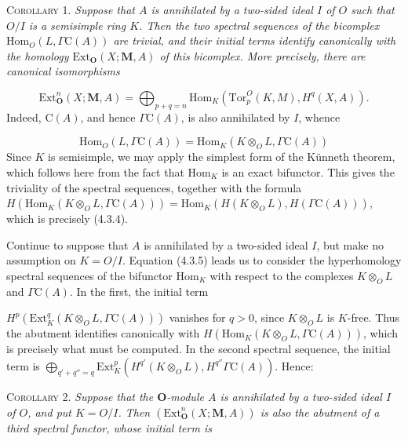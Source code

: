\clearpage
{}

\textsc{Corollary 1.} \textit{Suppose that $A$ is annihilated by a
two-sided ideal $I$ of $O$ such that $O/I$ is a semisimple ring $K$. Then the
two spectral sequences of the bicomplex $\mathrm{Hom}_O(L,\Gamma \mathrm C(A))$ are
trivial, and their initial terms identify canonically with the homology
$\mathrm{Ext}_{\mathbf O}(X;\mathbf M,A)$ of this bicomplex. More precisely,
there are canonical isomorphisms}

\[
\tag{4.3.4}
\mathrm{Ext}_{\mathbf O}^n(X;\mathbf M,A)=
\bigoplus_{p+q=n}
\mathrm{Hom}_K(\mathrm{Tor}_p^O(K,M),H^q(X,A)).
\]
Indeed, $\mathrm C(A)$, and hence $\Gamma \mathrm C(A)$, is also annihilated by $I$, whence

\[
\tag{4.3.5}
\mathrm{Hom}_O(L,\Gamma \mathrm C(A))=
\mathrm{Hom}_K(K\otimes_O L,\Gamma \mathrm C(A))
\]
Since $K$ is semisimple, we may apply the simplest form of the Künneth theorem,
which follows here from the fact that $\mathrm{Hom}_K$ is an exact bifunctor.
This gives the triviality of the spectral sequences, together with the formula
$H(\mathrm{Hom}_K(K\otimes_O L,\Gamma \mathrm C(A)))=
\mathrm{Hom}_K(H(K\otimes_O L),H(\Gamma \mathrm C(A))),$
which is precisely (4.3.4).

Continue to suppose that $A$ is annihilated by a two-sided ideal $I$, but make
no assumption on $K=O/I$. Equation (4.3.5) leads us to consider the
hyperhomology spectral sequences of the bifunctor $\mathrm{Hom}_K$ with
respect to the complexes $K\otimes_O L$ and $\Gamma \mathrm C(A)$. In the first, the
initial term

$H^p(\mathrm{Ext}_K^q(K\otimes_O L,\Gamma \mathrm C(A)))$ vanishes for $q>0$, since
$K\otimes_O L$ is $K$-free. Thus the abutment identifies canonically with
$H(\mathrm{Hom}_K(K\otimes_O L,\Gamma \mathrm C(A)))$, which is precisely what must be
computed. In the second spectral sequence, the initial term is
$\displaystyle \bigoplus_{q'+q''=q}
\mathrm{Ext}_K^p(H^{q'}(K\otimes_O L),H^{q''}\Gamma \mathrm C(A)).$
Hence:

\textsc{Corollary 2.} \textit{Suppose that the $\mathbf O$-module
$A$ is annihilated by a two-sided ideal $I$ of $O$, and put $K=O/I$. Then
$(\mathrm{Ext}_{\mathbf O}^n(X;\mathbf M,A))$ is also the abutment of a third
spectral functor, whose initial term is}

